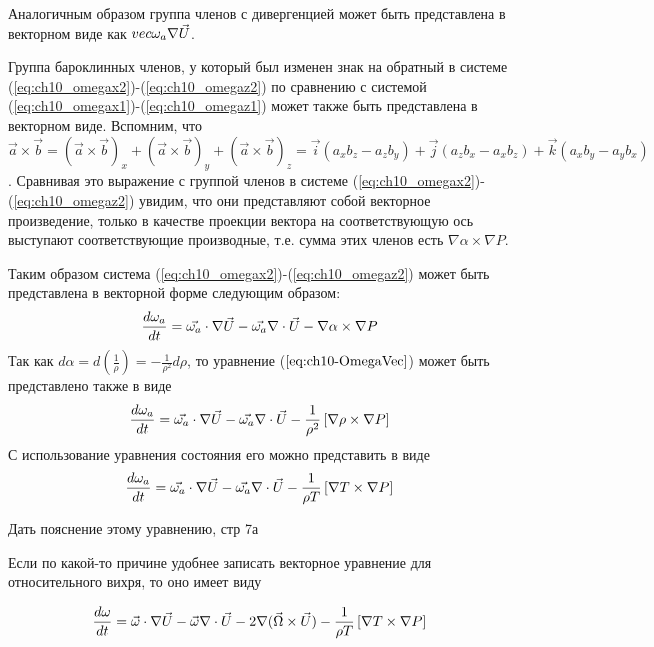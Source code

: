 Аналогичным образом группа членов  с дивергенцией может быть представлена в векторном виде как $\\vec{\omega_a}\nabla\vec{U}$. 

Группа бароклинных членов, у который был изменен знак на обратный в системе (\ref{eq:ch10_omegax2})-(\ref{eq:ch10_omegaz2}) по сравнению с системой (\ref{eq:ch10_omegax1})-(\ref{eq:ch10_omegaz1}) может также быть представлена в векторном виде. Вспомним, что $\vec{a}\times\vec{b}=(\vec{a}\times\vec{b})_x+(\vec{a}\times\vec{b})_y+(\vec{a}\times\vec{b})_z=\vec{i}(a_xb_z-a_zb_y)+\vec{j}(a_zb_x-a_xb_z)+\vec{k}(a_xb_y-a_yb_x)$. Сравнивая это выражение с группой членов  в системе (\ref{eq:ch10_omegax2})-(\ref{eq:ch10_omegaz2}) увидим, что они представляют собой векторное произведение, только в качестве проекции вектора на соответствующую ось выступают соответствующие производные, т.е. сумма этих членов есть $\nabla\alpha\times\nabla P$. 

Таким образом система (\ref{eq:ch10_omegax2})-(\ref{eq:ch10_omegaz2}) может быть представлена в векторной форме следующим образом:
\begin{equation}
\label{eq:ch10-OmegaVec}
    \displaystyle\frac{d \omega_a}{d t}=\vec{\omega_a}\cdot\nabla{\vec{U}} - \vec{\omega_a}\nabla\cdot\vec{U} - \nabla\alpha \times \nabla P
\end{equation}
Так как $d\alpha=d \left( \frac{1}{\rho} \right)=-\frac{1}{\rho^2}d\rho$, то уравнение ($\ref{eq:ch10-OmegaVec}$) может быть представлено также в виде
\begin{equation}
\label{eq:ch10-OmegaVec1}
    \displaystyle\frac{d \omega_a}{d t}=\vec{\omega_a}\cdot\nabla{\vec{U}} - \vec{\omega_a}\nabla\cdot\vec{U} - \frac{1}{\rho^2} \left[ \nabla\rho \times \nabla P \right]
\end{equation}
С использование уравнения состояния его можно представить в виде
\begin{equation}
\label{eq:ch10-OmegaVec2}
    \displaystyle\frac{d \omega_a}{d t}=\vec{\omega_a}\cdot\nabla{\vec{U}} - \vec{\omega_a}\nabla\cdot\vec{U} - \frac{1}{\rho T} \left[ \nabla T \times \nabla P \right]
\end{equation}
\begin{warn}
    Дать пояснение этому уравнению, стр 7а
\end{warn}

Если по какой-то причине удобнее записать векторное уравнение для относительного вихря, то оно имеет виду 

\begin{equation}
\label{eq:ch10-OmegaVec3}
    \displaystyle\frac{d \omega}{d t}=\vec{\omega}\cdot\nabla{\vec{U}} - \vec{\omega}\nabla\cdot\vec{U} - 
    2\nabla(\vec{\Omega}\times\vec{U}) -\frac{1}{\rho T} \left[  \nabla T \times \nabla P \right]
\end{equation}


